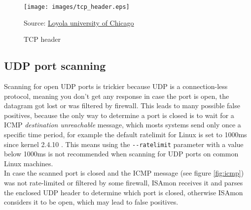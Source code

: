 \documentclass[11pt,a4paper]{article}
\newcommand{\source}[1]{\caption*{Source: {#1}} }
\begin{document}
		\begin{figure}[h]
			\centering
			\texttt{[image: images/tcp\_header.eps]}
			\caption{TCP header}
			\label{fig:tcp_header}
			\source{\href{http://intronetworks.cs.luc.edu/1/html/tcp.html}{Loyola university of Chicago}}
		\end{figure}
        

	\subsection{UDP port scanning}
		Scanning for open UDP ports is trickier because UDP is a connection-less protocol, meaning you don't get any response in case the port is open, the datagram got lost or was filtered by firewall. This leads to many possible false positives, because the only way to determine a port is closed is to wait for a ICMP \emph{destination unreachable} message, which mosts systems send only once a specific time period, for example the default ratelimit for Linux is set to 1000ms since kernel 2.4.10 \cite{man7:icmp}. This means using the \texttt{-{}-ratelimit} parameter with a value below 1000ms is not recommended when scanning for UDP ports on common Linux machines.\\
		In case the scanned port is closed and the ICMP message (see figure \ref{fig:icmp}) was not rate-limited or filtered by some firewall, ISAmon receives it and parses the enclosed UDP header to determine which port is closed, otherwise ISAmon considers it to be open, which may lead to false positives.



\newpage

\end{document}
